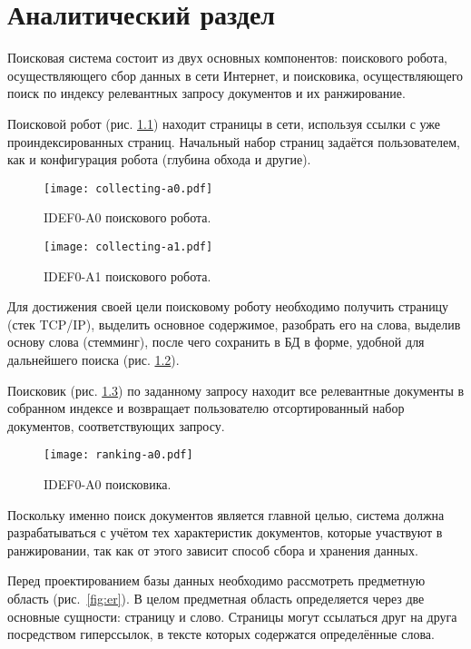 \chapter{Аналитический раздел}
Поисковая система состоит из двух основных компонентов: поискового робота, осуществляющего сбор данных в сети Интернет, и поисковика, осуществляющего поиск по индексу релевантных запросу документов и их ранжирование.

Поисковой робот (рис. \ref{fig:collecting-a0}) находит страницы в сети, используя ссылки с уже проиндексированных страниц. Начальный набор страниц задаётся пользователем, как и конфигурация робота (глубина обхода и другие).

\begin{figure}[h]
  \centering
  \texttt{[image: collecting-a0.pdf]}
  \caption{IDEF0-A0 поискового робота.}
  \label{fig:collecting-a0}
\end{figure}

\begin{figure}[h]
  \centering
  \texttt{[image: collecting-a1.pdf]}
  \caption{IDEF0-A1 поискового робота.}
  \label{fig:collecting-a1}
\end{figure}

Для достижения своей цели поисковому роботу необходимо получить страницу (стек TCP/IP), выделить основное содержимое, разобрать его на слова, выделив основу слова (стемминг), после чего сохранить в БД в форме, удобной для дальнейшего поиска (рис. \ref{fig:collecting-a1}).

Поисковик (рис. \ref{fig:ranking-a0}) по заданному запросу находит все релевантные документы в собранном индексе и возвращает пользователю отсортированный набор документов, соответствующих запросу.

\begin{figure}[h]
  \centering
  \texttt{[image: ranking-a0.pdf]}
  \caption{IDEF0-A0 поисковика.}
  \label{fig:ranking-a0}
\end{figure}

Поскольку именно поиск документов является главной целью, система должна разрабатываться с учётом тех характеристик документов, которые участвуют в ранжировании, так как от этого зависит способ сбора и хранения данных.

Перед проектированием базы данных необходимо рассмотреть предметную область (рис.~\ref{fig:er}). В целом предметная область определяется через две основные сущности: страницу и слово. Страницы могут ссылаться друг на друга посредством гиперссылок, в тексте которых содержатся определённые слова.

